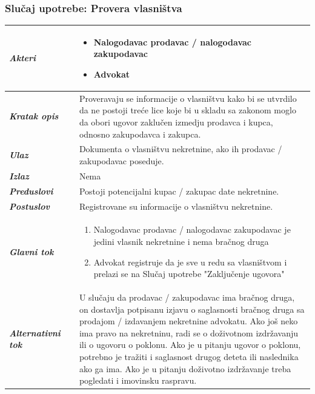 \documentclass[20pt]{article}
\begin{document}
\subsubsection{\bfseries \large Slu\v{c}aj upotrebe: Provera vlasni\v stva}
\begin{center}
\begin{longtable}{p{0.23\linewidth} p{0.77\linewidth}}
 \hline
 {\it \bfseries Akteri} & \begin{itemize}
    \item Nalogodavac prodavac / nalogodavac zakupodavac
    \item Advokat
\end{itemize}\\
\hline

 {\it \bfseries Kratak opis} & Proveravaju se informacije o vlasni\v stvu kako bi se utvrdilo da ne postoji tre\' ce lice koje bi u skladu sa zakonom moglo da obori ugovor zaklu\v cen izmedju prodavca i kupca, odnosno zakupodavca i zakupca.\\ 
 \hline
 
 {\it \bfseries Ulaz} & Dokumenta o vlasni\v stvu nekretnine, ako ih prodavac / zakupodavac poseduje.\\ 
 \hline
 
 {\it \bfseries Izlaz} & Nema\\
 \hline
 
 {\it \bfseries Preduslovi} & Postoji potencijalni kupac / zakupac date nekretnine.\\
 \hline

 {\it \bfseries Postuslov} & Registrovane su informacije o vlasni\v stvu nekretnine.\\
 \hline

     {\it \bfseries Glavni tok} &  
     \begin{enumerate}
        \item Nalogodavac prodavac / nalogodavac zakupodavac je jedini vlasnik nekretnine i nema bra\v cnog druga
        \item Advokat registruje da je sve u redu sa vlasni\v stvom
        i prelazi se na Slu\v{c}aj upotrebe "Zaklju\v cenje ugovora"
    \end{enumerate}\\
 \hline
 {\it \bfseries Alternativni tok} & U slu\v caju da prodavac / zakupodavac ima bra\v cnog druga, on dostavlja potpisanu izjavu o saglasnosti bra\v cnog druga sa prodajom / izdavanjem nekretnine advokatu. Ako jo\v s neko ima pravo na nekretninu, radi se o do\v zivotnom izdr\v zavanju ili o ugovoru o poklonu. Ako je u pitanju ugovor o poklonu, potrebno je tra\v ziti i saglasnost drugog deteta ili naslednika ako ga ima. Ako je u pitanju do\v zivotno izdr\v zavanje treba pogledati i imovinsku raspravu. \\
 \hline
\end{longtable}
\end{center}
\end{document}
